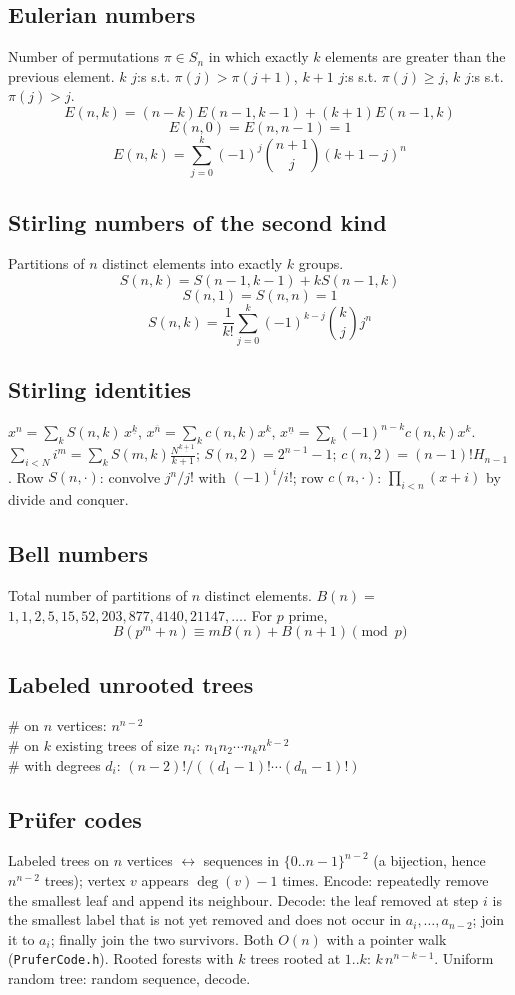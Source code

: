 	\subsection{Eulerian numbers}
		Number of permutations $\pi \in S_n$ in which exactly $k$ elements are greater than the previous element. $k$ $j$:s s.t. $\pi(j)>\pi(j+1)$, $k+1$ $j$:s s.t. $\pi(j)\geq j$, $k$ $j$:s s.t. $\pi(j)>j$.
		$$E(n,k) = (n-k)E(n-1,k-1) + (k+1)E(n-1,k)$$
		$$E(n,0) = E(n,n-1) = 1$$
		$$E(n,k) = \sum_{j=0}^k(-1)^j\binom{n+1}{j}(k+1-j)^n$$

	\subsection{Stirling numbers of the second kind}
		Partitions of $n$ distinct elements into exactly $k$ groups.
		$$S(n,k) = S(n-1,k-1) + k S(n-1,k)$$
		$$S(n,1) = S(n,n) = 1$$
		$$S(n,k) = \frac{1}{k!}\sum_{j=0}^k (-1)^{k-j}\binom{k}{j}j^n$$
	\subsection{Stirling identities}
	$x^n=\sum_kS(n,k)\,x^{\underline k}$, $x^{\overline n}=\sum_kc(n,k)x^k$, $x^{\underline n}=\sum_k(-1)^{n-k}c(n,k)x^k$.
	$\sum_{i<N}i^m=\sum_kS(m,k)\frac{N^{\underline{k+1}}}{k+1}$; $S(n,2)=2^{n-1}-1$; $c(n,2)=(n-1)!H_{n-1}$.
	Row $S(n,\cdot)$: convolve $j^n/j!$ with $(-1)^i/i!$; row $c(n,\cdot)$: $\prod_{i<n}(x+i)$ by divide and conquer.


	\subsection{Bell numbers}
		Total number of partitions of $n$ distinct elements. $B(n) =$
		$1, 1, 2, 5, 15, 52, 203, 877, 4140, 21147, \dots$. For $p$ prime,
		\[ B(p^m+n)\equiv mB(n)+B(n+1) \pmod{p} \]

	\subsection{Labeled unrooted trees}
		\# on $n$ vertices: $n^{n-2}$ \\
		\# on $k$ existing trees of size $n_i$: $n_1n_2\cdots n_k n^{k-2}$ \\
		\# with degrees $d_i$: $(n-2)! / ((d_1-1)! \cdots (d_n-1)!)$

	\subsection{Pr\"ufer codes}
		Labeled trees on $n$ vertices $\leftrightarrow$ sequences in $\{0..n-1\}^{n-2}$ (a bijection, hence $n^{n-2}$ trees); vertex $v$ appears $\deg(v)-1$ times.
		Encode: repeatedly remove the smallest leaf and append its neighbour. Decode: the leaf removed at step $i$ is the smallest label that is not yet removed and does not occur in $a_i, \dots, a_{n-2}$; join it to $a_i$; finally join the two survivors. Both $O(n)$ with a pointer walk (\texttt{PruferCode.h}).
		Rooted forests with $k$ trees rooted at $1..k$: $k\,n^{n-k-1}$. Uniform random tree: random sequence, decode.

